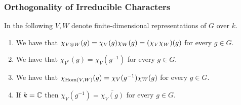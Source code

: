 \subsubsection{Orthogonality of Irreducible Characters}


\begin{conventions}
  In the following $V, W$ denote finite-dimensional representations of $G$ over $k$.
\end{conventions}

\begin{lemma}
  \label{lemma: more characters for groups}
  \leavevmode
  \begin{enumerate}
    \item
      We have that $\chi_{V \mathbin{\otimes} W}(g) = \chi_V(g) \chi_W(g) = (\chi_V \chi_W)(g)$ for every $g \in G$.
    \item
      We have that $\chi_{V^*}(g) = \chi_V(g^{-1})$ for every $g \in G$.
    \item
      We have that $\chi_{\operatorname{Hom}(V, W)}(g) = \chi_V(g^{-1}) \chi_W(g)$ for every $g \in G$.
    \item
      If $k = \mathbb{C}$ then $\chi_V(g^{-1}) = \overline{\chi_V(g)}$ for every $g \in G$.
  \end{enumerate}
\end{lemma}


